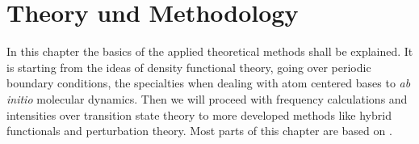 \documentclass[11pt,DIV=13,BCOR=5mm,a4paper,headinclude]{scrbook}
\begin{document}
\renewcommand{\contentsname}{Contents}
\clearpage
\tableofcontents
\clearpage

\chapter{Theory und Methodology}
In this chapter the basics of the applied theoretical methods shall be explained.
It is starting from the ideas of density functional theory, going over periodic boundary conditions, the specialties when dealing with atom centered bases to \textit{ab initio} molecular dynamics.
Then we will proceed with frequency calculations and intensities over transition state theory to more developed methods like hybrid functionals and perturbation theory.
Most parts of this chapter are based on \cite{jensen}.
\end{document}
